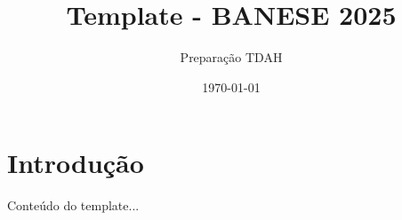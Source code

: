 \documentclass[12pt,a4paper]{article}
\title{Template - BANESE 2025}
\author{Preparação TDAH}
\date{\today}
\begin{document}
\maketitle
\tableofcontents
\newpage

\section{Introdução}
Conteúdo do template...
\end{document}
